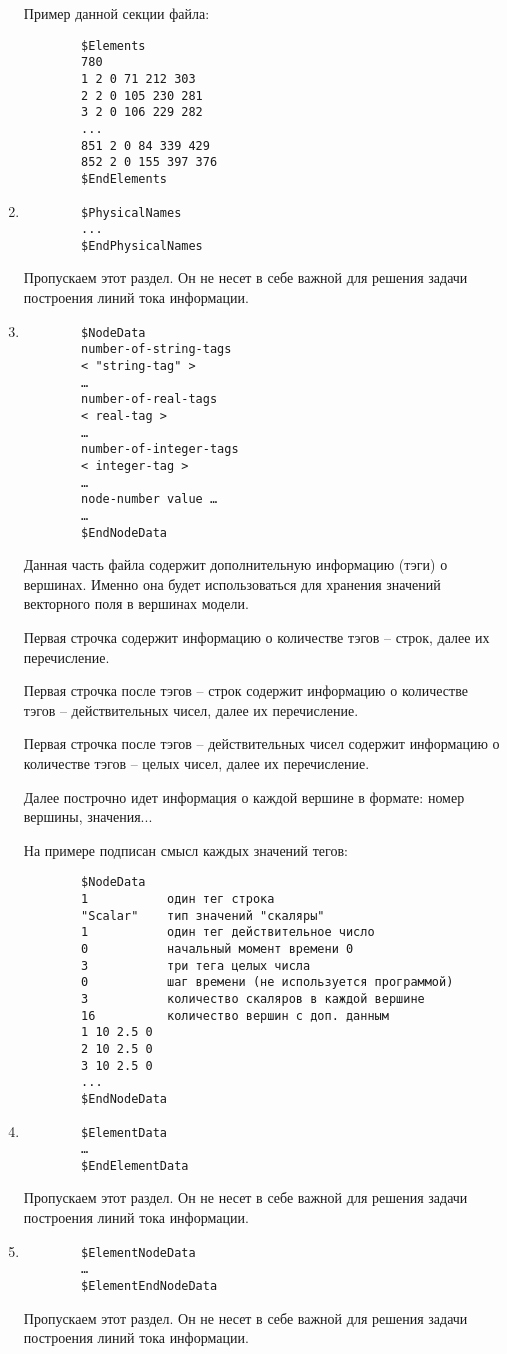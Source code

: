 \begin{enumerate}
	Пример данной секции файла:
	\begin{verbatim}
		$Elements
		780
		1 2 0 71 212 303
		2 2 0 105 230 281
		3 2 0 106 229 282
		...
		851 2 0 84 339 429
		852 2 0 155 397 376
		$EndElements
	\end{verbatim}
	\item 
	\begin{verbatim}
		$PhysicalNames
		...
		$EndPhysicalNames
	\end{verbatim}
	Пропускаем этот раздел. Он не несет в себе важной для решения задачи построения линий тока информации.
	\item
	\begin{verbatim}
		$NodeData
		number-of-string-tags
		< "string-tag" >
		…
		number-of-real-tags
		< real-tag >
		…
		number-of-integer-tags
		< integer-tag >
		…
		node-number value …
		…
		$EndNodeData
	\end{verbatim}
	Данная часть файла содержит дополнительную информацию (тэги) о вершинах. Именно она будет использоваться для хранения значений векторного поля в вершинах модели.
	
	Первая строчка содержит информацию о количестве тэгов -- строк, далее их перечисление.
	
	Первая строчка после тэгов -- строк содержит информацию о количестве тэгов -- действительных чисел, далее их перечисление.
	
	Первая строчка после тэгов -- действительных чисел содержит информацию о количестве тэгов -- целых чисел, далее их перечисление.
	
	Далее построчно идет информация о каждой вершине в формате: номер вершины, значения...
	
	На примере подписан смысл каждых значений тегов:
	\begin{verbatim}
		$NodeData
		1           один тег строка
		"Scalar"    тип значений "скаляры"
		1           один тег действительное число
		0           начальный момент времени 0
		3           три тега целых числа
		0           шаг времени (не используется программой)
		3           количество скаляров в каждой вершине
		16          количество вершин с доп. данным
		1 10 2.5 0
		2 10 2.5 0
		3 10 2.5 0
		...
		$EndNodeData
	\end{verbatim}
	\item
	\begin{verbatim}
		$ElementData
		…
		$EndElementData
	\end{verbatim}
	Пропускаем этот раздел. Он не несет в себе важной для решения задачи построения линий тока информации.
	\item
	\begin{verbatim}
		$ElementNodeData
		…
		$ElementEndNodeData
	\end{verbatim}
	Пропускаем этот раздел. Он не несет в себе важной для решения задачи построения линий тока информации.
\end{enumerate}

